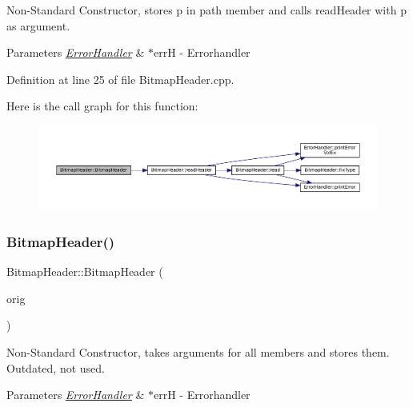 Non-\/\+Standard Constructor, stores p in path member and calls read\+Header with p as argument. 


\begin{DoxyParams}{Parameters}
{\em \mbox{\hyperlink{classErrorHandler}{Error\+Handler}}} & $\ast$errH -\/ Errorhandler \\
\hline
\end{DoxyParams}


Definition at line 25 of file Bitmap\+Header.\+cpp.

Here is the call graph for this function\+:
\nopagebreak
\begin{figure}[H]
\begin{center}
\leavevmode
\includegraphics[width=350pt]{classBitmapHeader_a2cf57f049eae7d2ee93d5749d678aca5_cgraph}
\end{center}
\end{figure}
\mbox{\label{classBitmapHeader_a25a5481f49d70a8c42a9efc17f17fd48}} 
\subsubsection{\texorpdfstring{BitmapHeader()}{BitmapHeader()}\hspace{0.1cm}{\footnotesize\ttfamily [3/3]}}
{\footnotesize\ttfamily Bitmap\+Header\+::\+Bitmap\+Header (\begin{DoxyParamCaption}\item[{const \mbox{\hyperlink{classBitmapHeader}{Bitmap\+Header}} \&}]{orig }\end{DoxyParamCaption})}



Non-\/\+Standard Constructor, takes arguments for all members and stores them. Outdated, not used. 


\begin{DoxyParams}{Parameters}
{\em \mbox{\hyperlink{classErrorHandler}{Error\+Handler}}} & $\ast$errH -\/ Errorhandler \\
\hline
\end{DoxyParams}


